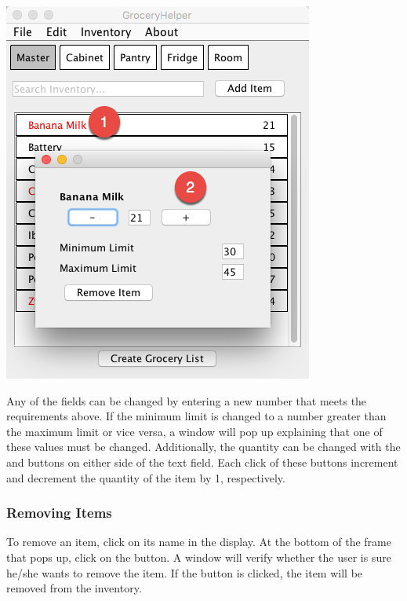 \documentclass[letterpaper,12pt]{article}
\begin{document}
\centerline{\includegraphics[scale=0.4]{20.png}}

Any of the fields can be changed by entering a new number that meets the requirements above. If the minimum limit is changed to a number greater than the maximum limit or vice versa, a window will pop up explaining that one of these values must be changed. Additionally, the quantity can be changed with the \menu{+} and \menu{-} buttons on either side of the text field. Each click of these buttons increment and decrement the quantity of the item by 1, respectively.
		
		\subsubsection{Removing Items}
To remove an item, click on its name in the display. At the bottom of the frame that pops up, click on the  button. A window will verify whether the user is sure he/she wants to remove the item. If the  button is clicked, the item will be removed from the inventory.\\
\end{document}
